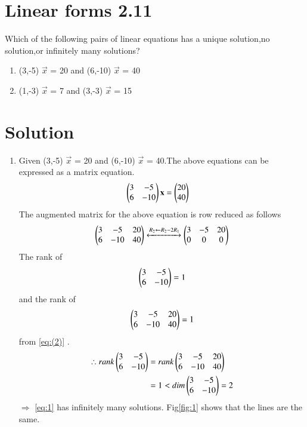 \documentclass[journal,12pt,twocolumn]{IEEEtran}
\begin{document}
\section{Linear forms 2.11}

Which of the following pairs of linear equations has a unique solution,no solution,or infinitely many solutions?
\begin{enumerate}
    \item (3,-5) $\vec{x}$ = 20 and (6,-10) $\vec{x}$ = 40
    \item (1,-3) $\vec{x}$ = 7 and (3,-3) $\vec{x}$ = 15
\end{enumerate}
%
%
\section{Solution}
\begin{enumerate}
    \item Given (3,-5) $\vec{x}$ = 20 and (6,-10) $\vec{x}$ = 40.The above equations can be expressed as a matrix equation.
    \begin{align}
\label{eq:1}
  \begin{pmatrix}3&-5\\6&-10\end{pmatrix}\mathbf{x} &= \begin{pmatrix}20\\40\end{pmatrix}
\end{align}
The augmented matrix for the above equation
is row reduced as follows
\begin{align}
    \begin{pmatrix}3&-5&20\\6&-10&40\end{pmatrix}\xleftrightarrow{R_2\leftarrow R_2 -2R_1}\begin{pmatrix}3&-5&20\\0&0&0\end{pmatrix} \label{eq:(2)}
\end{align}
The rank of\begin{equation} 
\begin{pmatrix}3&-5\\6&-10\end{pmatrix} = 1
\end{equation} and the rank of
\begin{equation} 
\begin{pmatrix}3&-5&20\\6&-10&40\end{pmatrix} = 1
\end{equation}from \ref{eq:(2)} .
\begin{align}
    \therefore rank \begin{pmatrix}3&-5\\6&-10\end{pmatrix} &= rank\begin{pmatrix}3&-5&20\\6&-10&40\end{pmatrix}\\
    &=1 < dim\begin{pmatrix}3&-5\\6&-10\end{pmatrix}=2
\end{align}
$\Longrightarrow$ \ref{eq:1} has infinitely many solutions.
Fig\ref{fig:1} shows that the lines are the same.
\begin{figure}[ht] 

\end{figure}
\end{enumerate}
\end{document}
